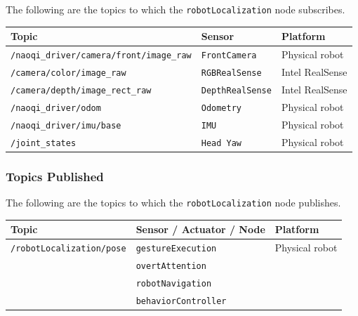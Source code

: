 \documentclass{CSSRforAfrica}
\begin{document}
{{The following are the topics to which the {\small \verb+robotLocalization+} node subscribes.

\begin{center}
\begin{tabularx}{\linewidth}{| l | l | X|}
\hline 
{\small Topic }                               & {\small Sensor }                            &  {\small Platform}       \\
\hline
{\footnotesize \verb+/naoqi_driver/camera/front/image_raw+ }  & {\footnotesize \verb+FrontCamera+}    & {\small Physical robot } \\ 
\hline
{\footnotesize \verb+/camera/color/image_raw+ }  & {\footnotesize \verb+RGBRealSense+}    & {\small Intel RealSense } \\ 
\hline
{\footnotesize \verb+/camera/depth/image_rect_raw+ }  & {\footnotesize \verb+DepthRealSense+}    & {\small Intel RealSense } \\ 
\hline
{\footnotesize \verb+/naoqi_driver/odom+ }  & {\footnotesize \verb+Odometry+}    & {\small Physical robot } \\ 
\hline
{\footnotesize \verb+/naoqi_driver/imu/base+ }  & {\footnotesize \verb+IMU+}    & {\small Physical robot } \\ 
\hline
{\footnotesize \verb+/joint_states+ }  & {\footnotesize \verb+Head Yaw+}    & {\small Physical robot } \\ 
\hline
\end{tabularx}
\end{center}


\subsubsection*{Topics Published}

The following are the topics to which the {\small \verb+robotLocalization+} node publishes.
 
\begin{center}
\begin{tabularx}{\linewidth}{| l | l | X|}
\hline 
{\small Topic }                                                                & {\small Sensor / Actuator / Node}    &  {\small Platform}       \\
\hline
{\footnotesize \verb+/robotLocalization/pose+ }  & {\footnotesize \verb+gestureExecution+} & {\small Physical robot} \\ 
                                                                                     & {\footnotesize \verb+overtAttention+} &   \\ 
                                                                                     & {\footnotesize \verb+robotNavigation+} &   \\ 
                                                                                     & {\footnotesize \verb+behaviorController+} &   \\ 
\hline
\end{tabularx}
\end{center}


}}
\end{document}
